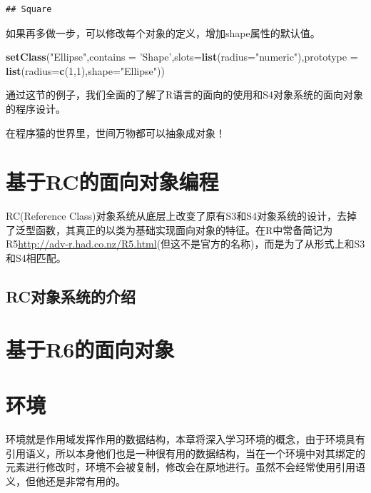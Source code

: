 \documentclass[]{book}
\newenvironment{Shaded}{\begin{snugshade}}{\end{snugshade}}
\newcommand{\KeywordTok}[1]{\textcolor[rgb]{0.13,0.29,0.53}{\textbf{#1}}}
\newcommand{\DataTypeTok}[1]{\textcolor[rgb]{0.13,0.29,0.53}{#1}}
\newcommand{\DecValTok}[1]{\textcolor[rgb]{0.00,0.00,0.81}{#1}}
\newcommand{\StringTok}[1]{\textcolor[rgb]{0.31,0.60,0.02}{#1}}
\newcommand{\NormalTok}[1]{#1}
\begin{document}
\begin{verbatim}
## Square
\end{verbatim}

如果再多做一步，可以修改每个对象的定义，增加shape属性的默认值。

\begin{Shaded}
\begin{Highlighting}[]
\KeywordTok{setClass}\NormalTok{(}\StringTok{"Ellipse"}\NormalTok{,}\DataTypeTok{contains =} \StringTok{'Shape'}\NormalTok{,}\DataTypeTok{slots=}\KeywordTok{list}\NormalTok{(}\DataTypeTok{radius=}\StringTok{"numeric"}\NormalTok{),}\DataTypeTok{prototype =} \KeywordTok{list}\NormalTok{(}\DataTypeTok{radius=}\KeywordTok{c}\NormalTok{(}\DecValTok{1}\NormalTok{,}\DecValTok{1}\NormalTok{),}\DataTypeTok{shape=}\StringTok{"Ellipse"}\NormalTok{))}
\end{Highlighting}
\end{Shaded}

通过这节的例子，我们全面的了解了R语言的面向的使用和S4对象系统的面向对象的程序设计。

在程序猿的世界里，世间万物都可以抽象成对象！

\chapter{基于RC的面向对象编程}\label{RC}

RC(Reference
Class)对象系统从底层上改变了原有S3和S4对象系统的设计，去掉了泛型函数，其真正的以类为基础实现面向对象的特征。在R中常备简记为R5\url{http://adv-r.had.co.nz/R5.html}(但这不是官方的名称)，而是为了从形式上和S3和S4相匹配。

\section{RC对象系统的介绍}\label{rc}

\chapter{基于R6的面向对象}\label{R6}

\chapter{环境}\label{env}

环境就是作用域发挥作用的数据结构，本章将深入学习环境的概念，由于环境具有引用语义，所以本身他们也是一种很有用的数据结构，当在一个环境中对其绑定的元素进行修改时，环境不会被复制，修改会在原地进行。虽然不会经常使用引用语义，但他还是非常有用的。
\end{document}
